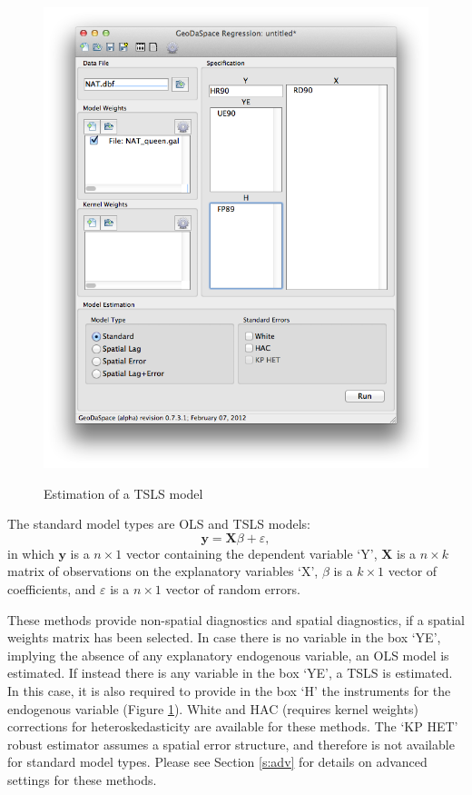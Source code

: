 \documentclass{article}
\begin{document}
\begin{figure}[htb]
\begin{center}
\includegraphics[width=0.7\linewidth]{tsls.png}\\
\caption{Estimation of a TSLS model}
\label{f:tsls}
\end{center}
\end{figure}

The standard model types are OLS and TSLS models:
\begin{equation}
\mathbf{y} =  \mathbf{X}\beta + \varepsilon,
\end{equation}
in which $\mathbf{y}$ is a $n \times 1$ vector containing the dependent variable `Y', $\mathbf{X}$ is a $n \times k$ matrix of observations on the explanatory variables `X', $\beta$ is a $k \times 1$ vector of coefficients, and $\varepsilon$ is a $n \times 1$ vector of random errors.

These methods provide non-spatial diagnostics and spatial diagnostics, if a spatial weights matrix has been selected. In case there is no variable in the box `YE', implying the absence of any explanatory endogenous variable, an OLS model is estimated. If instead there is any variable in the box `YE', a TSLS is estimated. In this case, it is also required to provide in the box `H' the instruments for the endogenous variable (Figure \ref{f:tsls}). White and HAC (requires kernel weights) corrections for heteroskedasticity are available for these methods. The `KP HET' robust estimator assumes a spatial error structure, and therefore is not available for standard model types. Please see Section \ref{s:adv} for details on advanced settings for these methods.
\FloatBarrier
\end{document}
